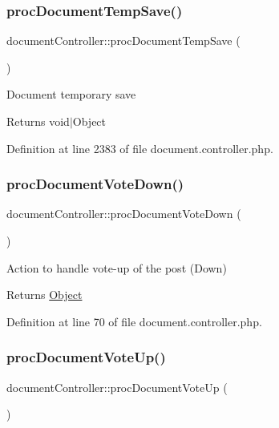 \subsubsection{\texorpdfstring{proc\+Document\+Temp\+Save()}{procDocumentTempSave()}}
{\footnotesize\ttfamily document\+Controller\+::proc\+Document\+Temp\+Save (\begin{DoxyParamCaption}{ }\end{DoxyParamCaption})}

Document temporary save \begin{DoxyReturn}{Returns}
void$\vert$\+Object 
\end{DoxyReturn}


Definition at line 2383 of file document.\+controller.\+php.

\mbox{\label{classdocumentController_a2df8114d4cfbe0a01c6bf29f68884d6e}} 
\subsubsection{\texorpdfstring{proc\+Document\+Vote\+Down()}{procDocumentVoteDown()}}
{\footnotesize\ttfamily document\+Controller\+::proc\+Document\+Vote\+Down (\begin{DoxyParamCaption}{ }\end{DoxyParamCaption})}

Action to handle vote-\/up of the post (Down) \begin{DoxyReturn}{Returns}
\hyperlink{classObject}{Object} 
\end{DoxyReturn}


Definition at line 70 of file document.\+controller.\+php.

\mbox{\label{classdocumentController_a32058ce80d8db1a0b6a97ce1d849afac}} 
\subsubsection{\texorpdfstring{proc\+Document\+Vote\+Up()}{procDocumentVoteUp()}}
{\footnotesize\ttfamily document\+Controller\+::proc\+Document\+Vote\+Up (\begin{DoxyParamCaption}{ }\end{DoxyParamCaption})}


